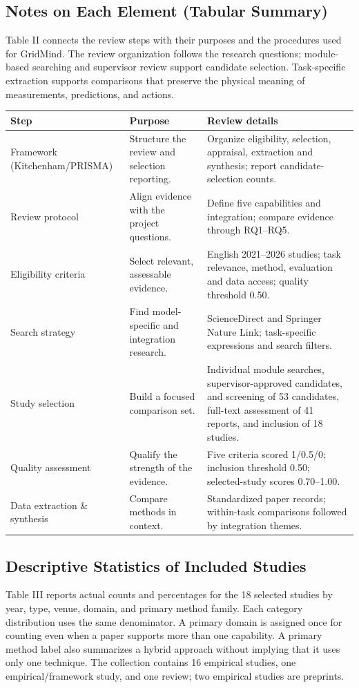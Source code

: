 \documentclass[journal,letterpaper]{IEEEtran}
\makeatletter
\newenvironment{inlinetable}{\par\medskip\noindent\begin{minipage}{\columnwidth}\def\@captype{table}}{\end{minipage}\par\medskip}
\makeatother
\begin{document}
\subsection{Notes on Each Element (Tabular Summary)}
Table II connects the review steps with their purposes and the procedures used for GridMind. The review organization follows the research questions; module-based searching and supervisor review support candidate selection. Task-specific extraction supports comparisons that preserve the physical meaning of measurements, predictions, and actions.
\begin{inlinetable}
\caption{LR methodology summary}
\centering\footnotesize\setlength{\tabcolsep}{3pt}
\begin{tabularx}{\columnwidth}{@{}p{}p{}X@{}}\toprule
Step & Purpose & Review details \\ \midrule
Framework (Kitchenham/PRISMA) & Structure the review and selection reporting. & Organize eligibility, selection, appraisal, extraction and synthesis; report candidate-selection counts. \\[4pt]
Review protocol & Align evidence with the project questions. & Define five capabilities and integration; compare evidence through RQ1--RQ5. \\[4pt]
Eligibility criteria & Select relevant, assessable evidence. & English 2021--2026 studies; task relevance, method, evaluation and data access; quality threshold 0.50. \\[4pt]
Search strategy & Find model-specific and integration research. & ScienceDirect and Springer Nature Link; task-specific expressions and search filters. \\[4pt]
Study selection & Build a focused comparison set. & Individual module searches, supervisor-approved candidates, and screening of 53 candidates, full-text assessment of 41 reports, and inclusion of 18 studies. \\[4pt]
Quality assessment & Qualify the strength of the evidence. & Five criteria scored 1/0.5/0; inclusion threshold 0.50; selected-study scores 0.70--1.00. \\[4pt]
Data extraction \& synthesis & Compare methods in context. & Standardized paper records; within-task comparisons followed by integration themes. \\
\bottomrule\end{tabularx}
\end{inlinetable}

\subsection{Descriptive Statistics of Included Studies}
Table III reports actual counts and percentages for the 18 selected studies by year, type, venue, domain, and primary method family. Each category distribution uses the same denominator. A primary domain is assigned once for counting even when a paper supports more than one capability. A primary method label also summarizes a hybrid approach without implying that it uses only one technique. The collection contains 16 empirical studies, one empirical/framework study, and one review; two empirical studies are preprints.
\end{document}
